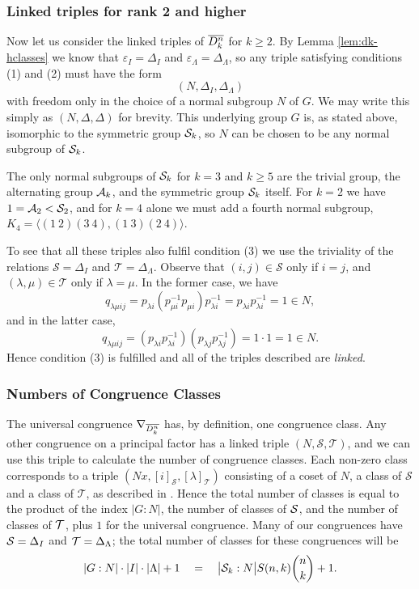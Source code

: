 \subsubsection{Linked triples for rank 2 and higher}
\label{sec:k2}
Now let us consider the linked triples of $\overline{D_k^n}$ for $k \geq 2$.  By Lemma
\ref{lem:dk-hclasses} we
know that $\varepsilon_I = \Delta_I$ and $\varepsilon_\Lambda = \Delta_\Lambda$,
so any triple satisfying conditions (1) and (2) must have the form
$$(N, \Delta_I, \Delta_\Lambda)$$
with freedom only in the choice of a normal subgroup $N$ of $G$.  We may write
this simply as $(N, \Delta, \Delta)$ for brevity.  This
underlying group $G$ is, as stated above, isomorphic to the symmetric group
$\mathcal{S}_k$, so $N$ can be chosen to be any normal subgroup of $\mathcal{S}_k$.

The only normal subgroups of $\mathcal{S}_k$ for $k=3$ and $k \geq 5$ are the trivial group, the
alternating group $\mathcal{A}_k$, and the symmetric group $\mathcal{S}_k$ itself.  For $k=2$ we
have $1 = \mathcal{A}_2 < \mathcal{S}_2$, and for $k=4$ alone we must add a fourth normal subgroup,
$K_4 = \langle (1~2)(3~4), (1~3)(2~4) \rangle$.

To see that all these triples also fulfil condition (3) we use the triviality of
the relations $\mathcal{S} = \Delta_I$ and $\mathcal{T} = \Delta_\Lambda$.
Observe that $(i,j) \in \mathcal{S}$ only if $i = j$, and $(\lambda,\mu) \in
\mathcal{T}$ only if $\lambda = \mu$.  In the former case, we have
$$q_{\lambda \mu i j} = p_{\lambda i} (p_{\mu i}^{-1} p_{\mu i}) p_{\lambda
  i}^{-1} = p_{\lambda i} p_{\lambda i}^{-1} = 1 \in N,$$
and in the latter case,
$$q_{\lambda \mu i j} = (p_{\lambda i} p_{\lambda i}^{-1}) (p_{\lambda j}
p_{\lambda j}^{-1}) = 1 \cdot 1 = 1 \in N.$$ Hence condition (3) is fulfilled
and all of the triples described are \textit{linked}.

\subsubsection{Numbers of Congruence Classes}
\label{sec:nrclasses}
The universal congruence $\nabla_{\overline{D_k^n}}$ has, by definition, one
congruence class.  Any other congruence on a principal factor has a linked
triple $(N,\mathcal{S},\mathcal{T})$, and we can use this triple to calculate
the number of congruence classes.  Each non-zero class corresponds to a triple
$(Nx,[i]_\mathcal{S},[\lambda]_\mathcal{T})$ consisting of a coset of $N$, a
class of $\mathcal{S}$ and a class of $\mathcal{T}$, as described in
\cite[Theorem 3.2]{mtorpey_pre_msc}.  Hence the total number of classes is equal
to the product of the index $|G:N|$, the number of classes of $\mathcal{S}$, and the
number of classes of $\mathcal{T}$, plus $1$ for the universal congruence.  Many of our
congruences have $\mathcal{S}=\Delta_I$ and $\mathcal{T}=\Delta_\Lambda$; the total number of
classes for these congruences will be
$$|G:N| \cdot |I| \cdot |\Lambda| + 1
\quad=\quad \big|\mathcal{S}_k:N\big| S(n,k) \binom{n}{k} + 1.$$

